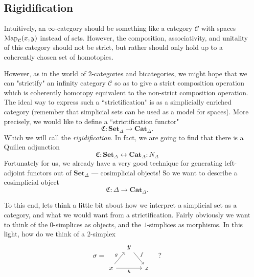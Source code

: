 \subsection{Rigidification}
\label{ssc:rigidification}

Intuitively, an $\infty$-category should be something like a category $\mathcal{C}$ with spaces $\operatorname{Map}_{\mathcal{C}}(x,y)$ instead of sets. However, the composition, associativity, and unitality of this category should not be strict, but rather should only hold up to a coherently chosen set of homotopies. 

However, as in the world of 2-categories and bicategories, we might hope that we can "strictify" an infinity category $\mathcal{C}$ so as to give a strict composition operation which is coherently homotopy equivalent to the non-strict composition operation. The ideal way to express such a ``strictification" is as a simplicially enriched category (remember that simplicial sets can be used as a model for spaces). More precisely, we would like to define a ``strictification functor"
\[
\mathfrak{C}:\mathbf{Set}_{\Delta} \to \mathbf{Cat}_\Delta. 
\] 
Which we will call the \emph{rigidification}. In fact, we are going to find that there is a Quillen adjunction 
\[
\mathfrak{C} : \mathbf{Set}_{\Delta} \leftrightarrow \mathbf{Cat}_\Delta : N_{\Delta}
\] 
Fortunately for us, we already have a very good technique for generating left-adjoint functors out of $\mathbf{Set}_{\Delta}$ --- cosimplicial objects! So we want to describe a cosimplicial object 
\[
\mathfrak{C}:\Delta\to \mathbf{Cat}_\Delta. 
\]

To this end, lets think a little bit about how we interpret a simplicial set as a category, and what we would want from a strictification. Fairly obviously we want to think of the 0-simplices as objects, and the $1$-simplices as morphisms. In this light, how do we think of a 2-simplex 
\begin{equation*}
\sigma=\begin{tikzcd}[column sep=small]
& y
\arrow[dr, "f"]
\\
x
\arrow[ur, "g"]
\arrow[rr, "h"']
&& z
\end{tikzcd} \quad ?
\end{equation*}

